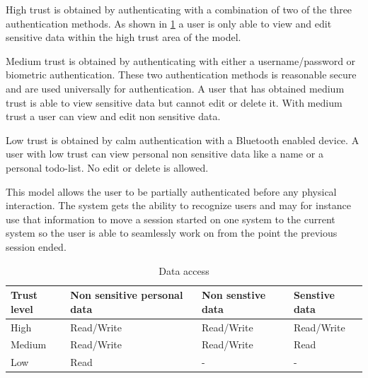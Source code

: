 High trust is obtained by authenticating with a combination of two of the three authentication methods.
As shown in \cref{table_data_access} a user is only able to view and edit sensitive data within the high trust area of the model.

Medium trust is obtained by authenticating with either a username/password or biometric authentication.
These two authentication methods is reasonable secure and are used universally for authentication.
A user that has obtained medium trust is able to view sensitive data but cannot edit or delete it.
With medium trust a user can view and edit non sensitive data.

Low trust is obtained by calm authentication with a Bluetooth enabled device.
A user with low trust can view personal non sensitive data like a name or a personal todo-list.
No edit or delete is allowed.

This model allows the user to be partially authenticated before any physical interaction.
The system gets the ability to recognize users and may for instance use that information to move a session started on one system to the current system so the user is able to seamlessly work on from the point the previous session ended.

\begin{table}[!t]
\caption{Data access}
\label{table_data_access}
\centering
\begin{tabular}{|p{1.3cm}|p{2.0cm}|p{2.0cm}|p{2.0cm}|}
\hline
\textbf{Trust level} & \textbf{Non sensitive personal data} & \textbf{Non senstive data} & \textbf{Senstive data}\\
\hline
High & Read/Write & Read/Write & Read/Write\\
\hline
Medium & Read/Write & Read/Write & Read\\
\hline
Low & Read & - & -\\
\hline
\end{tabular}
\end{table}